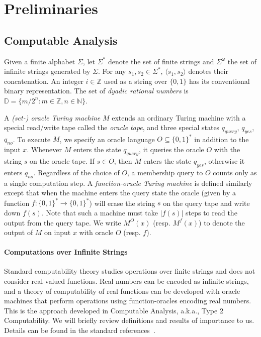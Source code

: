 \documentclass[conference]{IEEEtran}
\begin{document}
\section{Preliminaries}\label{pre}

\subsection{Computable Analysis}

Given a finite alphabet $\Sigma$, let $\Sigma^*$ denote the set of finite strings and $\Sigma^{\omega}$ the set of infinite strings generated by $\Sigma$. For any $s_1, s_2\in \Sigma^*$, $\langle s_1,s_2\rangle$ denotes their concatenation. An integer $i\in \mathbb{Z}$ used as a string over $\{0,1\}$ has its conventional binary representation. The set of {\em dyadic rational numbers} is $\mathbb{D} = \{m/2^n: m\in \mathbb{Z}, n\in \mathbb{N}\}$. 

A {\em (set-) oracle Turing machine} $M$ extends an ordinary Turing machine with a special read/write tape called the {\em oracle tape}, and three special states $q_{\mathit{query}}$, $q_{\mathit{yes}}$, $q_{\mathit{no}}$. To execute $M$, we specify an oracle language $O\subseteq \{0,1\}^*$ in addition to the input $x$. Whenever $M$ enters the state $q_{\mathit{query}}$, it queries the oracle $O$ with the string $s$ on the oracle tape. If $s\in O$, then $M$ enters the state $q_{\mathit{yes}}$, otherwise it enters $q_{\mathit{no}}$. Regardless of the choice of $O$, a membership query to $O$ counts only as a single computation step. A {\em function-oracle Turing machine} is defined similarly except that when the machine enters the query state the oracle (given by a function $f:\{0,1\}^*\rightarrow\{0,1\}^*$) will erase the string $s$ on the query tape and write down $f(s)$. Note that such a machine must take $|f(s)|$ steps to read the output from the query tape. We write $M^O(x)$ (resp. $M^f(x)$) to denote the output of $M$ on input $x$ with oracle $O$ (resp. $f$). 

\paragraph{Computations over Infinite Strings} Standard computability theory studies operations over finite strings and does not consider real-valued functions. Real numbers can be encoded as infinite strings, and a theory of computability of real functions can be developed with oracle machines that perform operations using function-oracles encoding real numbers. This is the approach developed in Computable Analysis, a.k.a., Type 2 Computability. We will briefly review definitions and results of importance to us. Details can be found in the standard references~\cite{CAbook,Kobook,vasco}.
\end{document}
